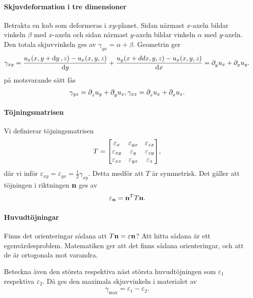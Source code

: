 \paragraph{Skjuvdeformation i tre dimensioner}
Betrakta en kub som deformeras i $xy$-planet. Sidan närmast $x$-axeln bildar vinkeln $\beta$ med $x$-axeln och sidan närmast $y$-axeln bildar vinkeln $\alpha$ med $y$-axeln. Den totala skjuvvinkeln ges av $\gamma_{yx} = \alpha + \beta$. Geometrin ger
\begin{align*}
	\gamma_{xy} = \frac{u_{x}(x, y + \dd{y}, z) - u_{x}(x, y, z)}{\dd{y}} + \frac{u_{y}(x + dd{x}, y, z) - u_{x}(x, y, z)}{\dd{x}} = \partial_{y}^{}u_{x} + \partial_{x}^{}u_{y}.
\end{align*}
på motsvarande sätt fås
\begin{align*}
	\gamma_{yz} = \partial_{z}^{}u_{y} + \partial_{y}^{}u_{z}, \gamma_{xz} = \partial_{z}^{}u_{x} + \partial_{x}^{}u_{z}.
\end{align*}

\paragraph{Töjningsmatrisen}
Vi definierar töjningsmatrisen
\begin{align*}
	T =
	\mqty[
		\varepsilon_{x}  & \varepsilon_{yx} & \varepsilon_{zx} \\
		\varepsilon_{xy} & \varepsilon_{y}  & \varepsilon_{zy} \\
		\varepsilon_{xz} & \varepsilon_{yz} & \varepsilon_{z}
	],
\end{align*}
där vi inför $\varepsilon_{xy} = \varepsilon_{yx} = \frac{1}{2}\gamma_{xy}$. Detta medför att $T$ är symmetrisk. Det gäller att töjningen i riktningen $\vb{n}$ ges av
\begin{align*}
	\varepsilon_{\vb{n}} = \vb{n}^{T}T\vb{n}.
\end{align*}

\paragraph{Huvudtöjningar}
Finns det orienteringar sådana att $T\vb{n} = \varepsilon\vb{n}$? Att hitta sådana är ett egenvärdesproblem. Matematiken ger att det finns sådana orienteringar, och att de är ortogonala mot varandra.

Beteckna även den största respektiva näst största huvudtöjningen som $\varepsilon_{1}$ respektiva $\varepsilon_{2}$. Då ges den maximala skjuvvinkeln i materialet av
\begin{align*}
	\gamma_{\text{max}} = \varepsilon_{1} - \varepsilon_{2}.
\end{align*}

